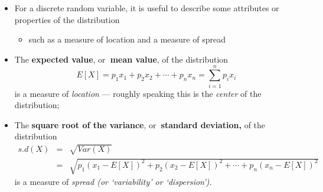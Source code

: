 \documentclass[smaller, handout]{beamer}\usepackage[]{graphicx}\usepackage[]{color}
\newenvironment{stepitemize}{\begin{itemize}[<+->]}{\end{itemize} }
\begin{document}
\begin{frame}{\secname}%
  \begin{stepitemize}
  \item For a discrete random variable, it is useful to describe some
  attributes or properties of the distribution

  \begin{stepitemize}
  \item such as a measure of location and a measure of spread
  \end{stepitemize}

  \item The \textbf{expected value}, or\textbf{\ mean value}, of the
  distribution \begin{equation*}
  E\left[ X\right] =p_{1}x_{1}+p_{2}x_{2}+\cdots + p_{n}x_{n} = \sum_{i=1}^{n} p_i x_i
  \end{equation*}%
  is a measure of \emph{location} --- roughly speaking this is the \emph{center} of the distribution;


  \item The \textbf{square root of the variance}, or\textbf{\ standard
  deviation,} of the distribution%
  \begin{eqnarray*}
  s.d\left( X\right) &=&\sqrt{Var\left( X\right) } \\
  &=&\sqrt{p_{1}\left( x_{1}-E\left[ X\right] \right) ^{2}+p_{2}\left( x_{2}-E%
  \left[ X\right] \right) ^{2}+\cdots + p_{n}\left( x_{n}-E\left[ X\right]
  \right) ^{2}}
  \end{eqnarray*}%
  is a measure of \emph{spread (or `variability' or `dispersion').}
  \end{stepitemize}

\end{frame}%
\end{document}
